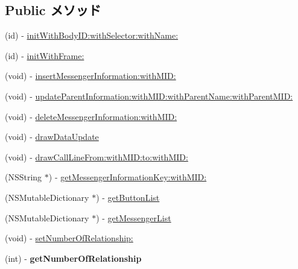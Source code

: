 \subsection*{Public メソッド}
\begin{DoxyCompactItemize}
\item 
(id) -\/ \hyperlink{interface_messenger_view_controller_a44c0a2552e50d6223a8230447be3e83a}{initWithBodyID:withSelector:withName:}
\item 
(id) -\/ \hyperlink{interface_messenger_view_controller_a1ac23270dbc04a95b72dd16b2c201c5a}{initWithFrame:}
\item 
(void) -\/ \hyperlink{interface_messenger_view_controller_aa30151ef1d95034a10fa31e9c8a7da22}{insertMessengerInformation:withMID:}
\item 
(void) -\/ \hyperlink{interface_messenger_view_controller_a3eb404c4ef5fc51caae10e71136f35ff}{updateParentInformation:withMID:withParentName:withParentMID:}
\item 
(void) -\/ \hyperlink{interface_messenger_view_controller_ab9c9343a0f520cdc1aa91b3985b31f7a}{deleteMessengerInformation:withMID:}
\item 
(void) -\/ \hyperlink{interface_messenger_view_controller_aba89f37600bb5cc7258a034614257dc6}{drawDataUpdate}
\item 
(void) -\/ \hyperlink{interface_messenger_view_controller_acfc602cab1e37653e205cc03bf909095}{drawCallLineFrom:withMID:to:withMID:}
\item 
(NSString $\ast$) -\/ \hyperlink{interface_messenger_view_controller_a9c958b9ee93a81551b3aa4209eaa3c71}{getMessengerInformationKey:withMID:}
\item 
(NSMutableDictionary $\ast$) -\/ \hyperlink{interface_messenger_view_controller_afa883d1d29e91d003087a0f4b839daf3}{getButtonList}
\item 
(NSMutableDictionary $\ast$) -\/ \hyperlink{interface_messenger_view_controller_a2e4617fc57087279158f9df78fab0a87}{getMessengerList}
\item 
(void) -\/ \hyperlink{interface_messenger_view_controller_aa75f66a06d37f03a7d2b51e9c7149051}{setNumberOfRelationship:}
\item 
\hypertarget{interface_messenger_view_controller_aa06b18307f500c793a8493da0969b57b}{
(int) -\/ {\bfseries getNumberOfRelationship}}
\label{d7/d34/interface_messenger_view_controller_aa06b18307f500c793a8493da0969b57b}


\end{DoxyCompactItemize}

